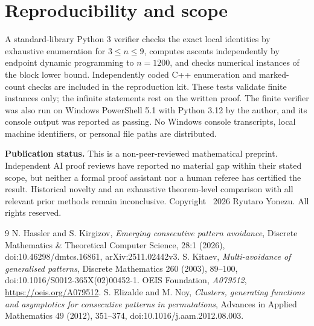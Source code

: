 \documentclass[11pt]{article}
\begin{document}
\section{Reproducibility and scope}
A standard-library Python 3 verifier checks the exact local identities by exhaustive enumeration for $3\le n\le9$, computes ascents independently by endpoint dynamic programming to $n=1200$, and checks numerical instances of the block lower bound. Independently coded C++ enumeration and marked-count checks are included in the reproduction kit. These tests validate finite instances only; the infinite statements rest on the written proof. The finite verifier was also run on Windows PowerShell 5.1 with Python 3.12 by the author, and its console output was reported as passing. No Windows console transcripts, local machine identifiers, or personal file paths are distributed.

\noindent\textbf{Publication status.} This is a non-peer-reviewed mathematical preprint. Independent AI proof reviews have reported no material gap within their stated scope, but neither a formal proof assistant nor a human referee has certified the result. Historical novelty and an exhaustive theorem-level comparison with all relevant prior methods remain inconclusive. Copyright \textcopyright\ 2026 Ryutaro Yonezu. All rights reserved.

\begin{thebibliography}{9}
 N. Hassler and S. Kirgizov, \emph{Emerging consecutive pattern avoidance}, Discrete Mathematics \& Theoretical Computer Science, 28:1 (2026), doi:10.46298/dmtcs.16861, arXiv:2511.02442v3.
 S. Kitaev, \emph{Multi-avoidance of generalised patterns}, Discrete Mathematics 260 (2003), 89--100, doi:10.1016/S0012-365X(02)00452-1.
 OEIS Foundation, \emph{A079512}, \url{https://oeis.org/A079512}.
 S. Elizalde and M. Noy, \emph{Clusters, generating functions and asymptotics for consecutive patterns in permutations}, Advances in Applied Mathematics 49 (2012), 351--374, doi:10.1016/j.aam.2012.08.003.
\end{thebibliography}
\end{document}
